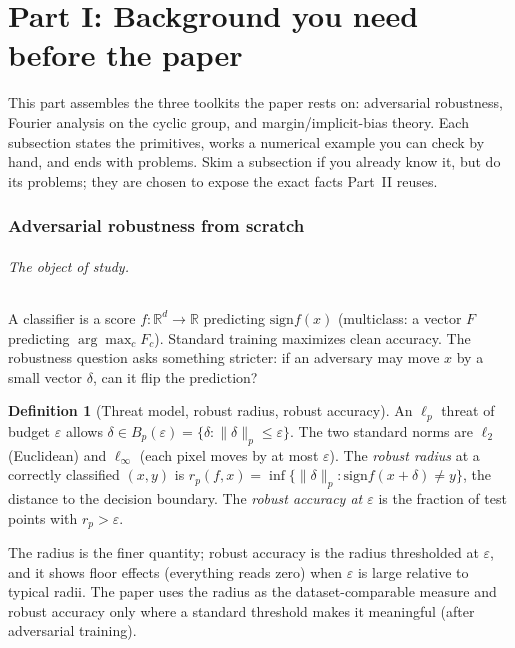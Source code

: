 \documentclass[11pt]{article}
\theoremstyle{plain}
\theoremstyle{definition}
\newtheorem{definition}[theorem]{Definition}
\theoremstyle{remark}
\newcommand{\R}{\mathbb{R}}
\newcommand{\sign}{\mathrm{sign}}
\begin{document}
\part*{Part I: Background you need before the paper}

This part assembles the three toolkits the paper rests on: adversarial robustness, Fourier analysis on the cyclic
group, and margin/implicit-bias theory. Each subsection states the primitives, works a numerical example you can
check by hand, and ends with problems. Skim a subsection if you already know it, but do its problems; they are
chosen to expose the exact facts Part~II reuses.

\section{Adversarial robustness from scratch}\label{sec:rob}

\paragraph{The object of study.} A classifier is a score $f:\R^d\to\R$ predicting $\sign f(x)$ (multiclass: a vector
$F$ predicting $\arg\max_c F_c$). Standard training maximizes clean accuracy. The robustness question asks something
stricter: if an adversary may move $x$ by a small vector $\delta$, can it flip the prediction?

\begin{definition}[Threat model, robust radius, robust accuracy]
An $\ell_p$ threat of budget $\varepsilon$ allows $\delta\in B_p(\varepsilon)=\{\delta:\|\delta\|_p\le\varepsilon\}$.
The two standard norms are $\ell_2$ (Euclidean) and $\ell_\infty$ (each pixel moves by at most $\varepsilon$). The
\emph{robust radius} at a correctly classified $(x,y)$ is $r_p(f,x)=\inf\{\|\delta\|_p:\sign f(x+\delta)\ne y\}$,
the distance to the decision boundary. The \emph{robust accuracy at $\varepsilon$} is the fraction of test points
with $r_p>\varepsilon$.
\end{definition}

The radius is the finer quantity; robust accuracy is the radius thresholded at $\varepsilon$, and it shows floor
effects (everything reads zero) when $\varepsilon$ is large relative to typical radii. The paper uses the radius
as the dataset-comparable measure and robust accuracy only where a standard threshold makes it meaningful (after
adversarial training).
\end{document}
